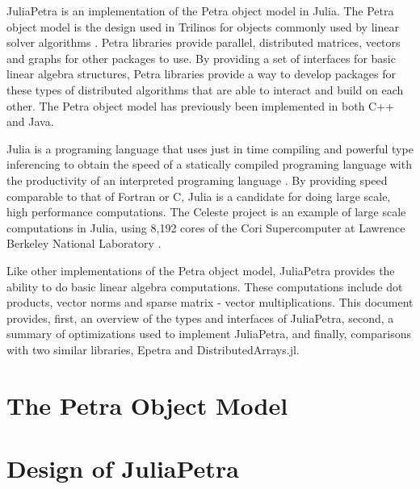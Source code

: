 \documentclass[acmsmall]{acmart}
\begin{document}
	JuliaPetra is an implementation of the Petra object model in Julia.
	The Petra object model is the design used in Trilinos for objects commonly used by linear solver algorithms
	\cite{Heroux:2005:Trilinos}.
	Petra libraries provide parallel, distributed matrices, vectors and graphs for other packages to use.
	By providing a set of interfaces for basic linear algebra structures, Petra libraries provide a way
	to develop packages for these types of distributed algorithms that are able to interact and build on each other.
	The Petra object model has previously been implemented in both C++ and Java.
	
	Julia is a programing language that uses just in time compiling and powerful type inferencing
	to obtain the speed of a statically compiled programing language with the productivity of an
	interpreted programing language \cite{Bezanson:2017:FreshApproach}.
	By providing speed comparable to that of Fortran or C, Julia is a candidate for doing large scale,
	high performance computations.
	The Celeste project is an example of large scale computations in Julia,
	using 8,192 cores of the Cori Supercomputer
	at Lawrence Berkeley National Laboratory \cite{Bezanson:2017:FreshApproach}.
	
	Like other implementations of the Petra object model,
	JuliaPetra provides the ability to do basic linear algebra computations.
	These computations include dot products, vector norms and sparse matrix - vector multiplications.
	This document provides, first, an overview of the types and interfaces of JuliaPetra,
	second, a summary of optimizations used to implement JuliaPetra,
	and finally, comparisons with two similar libraries, Epetra and DistributedArrays.jl.
	
	\section{The Petra Object Model}
	
	
	\section{Design of JuliaPetra}
	
\end{document}
